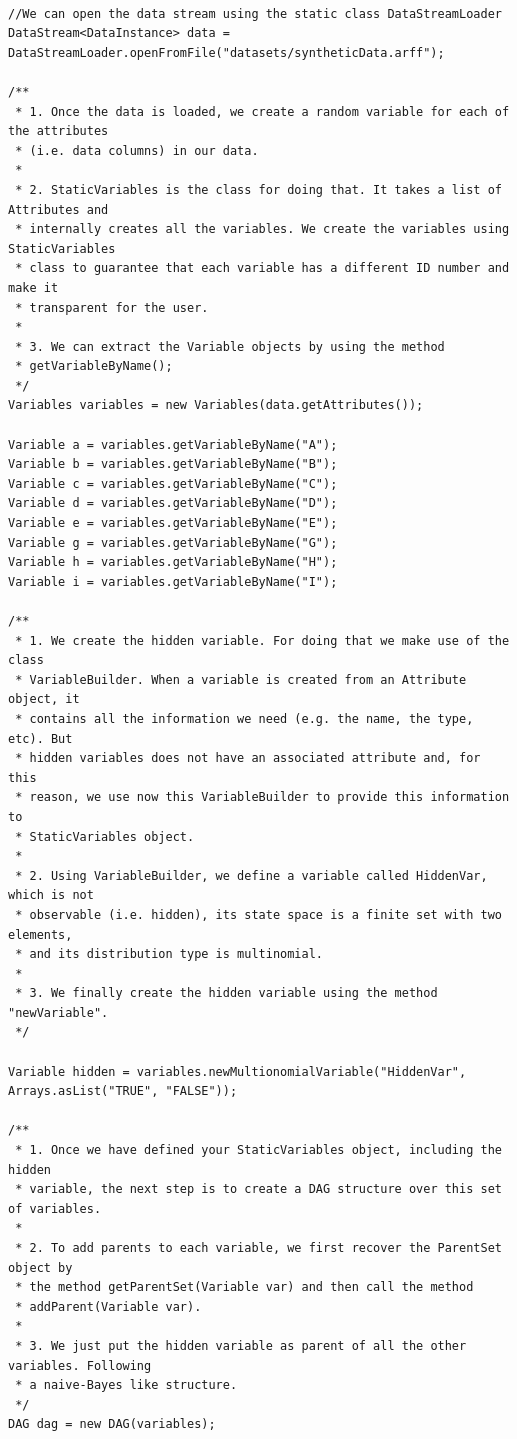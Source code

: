 \begin{lstlisting}

//We can open the data stream using the static class DataStreamLoader
DataStream<DataInstance> data = DataStreamLoader.openFromFile("datasets/syntheticData.arff");

/**
 * 1. Once the data is loaded, we create a random variable for each of the attributes 
 * (i.e. data columns) in our data.
 *
 * 2. StaticVariables is the class for doing that. It takes a list of Attributes and 
 * internally creates all the variables. We create the variables using StaticVariables 
 * class to guarantee that each variable has a different ID number and make it 
 * transparent for the user.
 *
 * 3. We can extract the Variable objects by using the method 
 * getVariableByName();
 */
Variables variables = new Variables(data.getAttributes());

Variable a = variables.getVariableByName("A");
Variable b = variables.getVariableByName("B");
Variable c = variables.getVariableByName("C");
Variable d = variables.getVariableByName("D");
Variable e = variables.getVariableByName("E");
Variable g = variables.getVariableByName("G");
Variable h = variables.getVariableByName("H");
Variable i = variables.getVariableByName("I");

/**
 * 1. We create the hidden variable. For doing that we make use of the class 
 * VariableBuilder. When a variable is created from an Attribute object, it 
 * contains all the information we need (e.g. the name, the type, etc). But 
 * hidden variables does not have an associated attribute and, for this 
 * reason, we use now this VariableBuilder to provide this information to
 * StaticVariables object.
 *
 * 2. Using VariableBuilder, we define a variable called HiddenVar, which is not 
 * observable (i.e. hidden), its state space is a finite set with two elements, 
 * and its distribution type is multinomial.
 *
 * 3. We finally create the hidden variable using the method "newVariable".
 */

Variable hidden = variables.newMultionomialVariable("HiddenVar", Arrays.asList("TRUE", "FALSE"));

/**
 * 1. Once we have defined your StaticVariables object, including the hidden 
 * variable, the next step is to create a DAG structure over this set of variables.
 *
 * 2. To add parents to each variable, we first recover the ParentSet object by 
 * the method getParentSet(Variable var) and then call the method 
 * addParent(Variable var).
 *
 * 3. We just put the hidden variable as parent of all the other variables. Following 
 * a naive-Bayes like structure.
 */
DAG dag = new DAG(variables);


\end{lstlisting}

